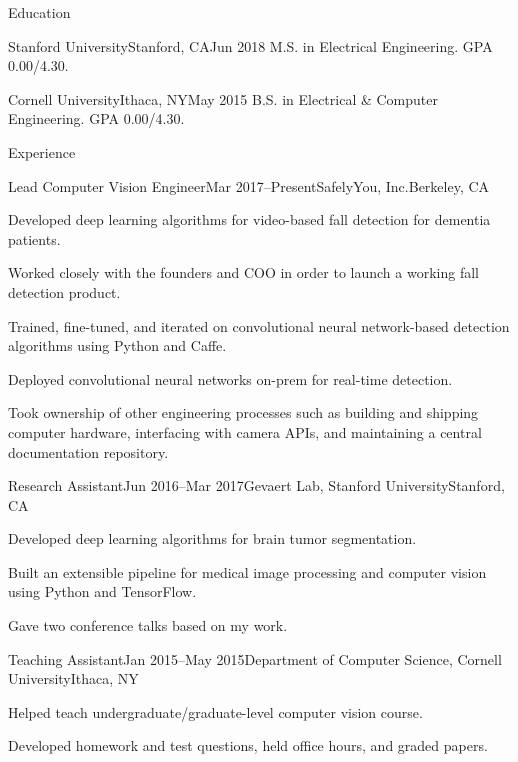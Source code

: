 \documentclass{resume}
\begin{document}
\begin{rSection}{Education}

    \begin{rEducation}{Stanford University}{Stanford, CA}{Jun 2018}
        M.S. in Electrical Engineering. GPA 0.00/4.30.
    \end{rEducation}

    \begin{rEducation}{Cornell University}{Ithaca, NY}{May 2015}
        B.S. in Electrical \& Computer Engineering. GPA 0.00/4.30.
    \end{rEducation}

\end{rSection}

\begin{rSection}{Experience}

    \begin{rExperience}{Lead Computer Vision Engineer}{Mar 2017--Present}{SafelyYou, Inc.}{Berkeley, CA}
        \item Developed deep learning algorithms for video-based fall detection for dementia patients.
        \item Worked closely with the founders and COO in order to launch a working fall detection product.
        \item Trained, fine-tuned, and iterated on convolutional neural network-based detection algorithms using Python and Caffe.
        \item Deployed convolutional neural networks on-prem for real-time detection.
        \item Took ownership of other engineering processes such as building and shipping computer hardware, interfacing with camera APIs, and maintaining a central documentation repository.
    \end{rExperience}
    
    \begin{rExperience}{Research Assistant}{Jun 2016--Mar 2017}{Gevaert Lab, Stanford University}{Stanford, CA}
        \item Developed deep learning algorithms for brain tumor segmentation.
        \item Built an extensible pipeline for medical image processing and computer vision using Python and TensorFlow.
        \item Gave two conference talks based on my work.
    \end{rExperience}

    \begin{rExperience}{Teaching Assistant}{Jan 2015--May 2015}{Department of Computer Science, Cornell University}{Ithaca, NY}
        \item Helped teach undergraduate/graduate-level computer vision course.
        \item Developed homework and test questions, held office hours, and graded papers.
    \end{rExperience}


\end{rSection}
\end{document}
